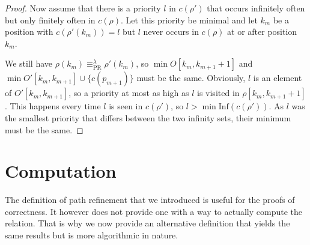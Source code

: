 \begin{proof}
	Now assume that there is a priority $l$ in $c(\rho')$ that occurs infinitely often but only finitely often in $c(\rho)$. Let this priority be minimal and let $k_m$ be a position with $c(\rho'(k_m)) = l$ but $l$ never occurs in $c(\rho)$ at or after position $k_m$.
	
	We still have $\rho(k_m) \equiv_\text{PR}^\lambda \rho'(k_m)$, so $\min O[k_m, k_{m+1} + 1]$ and $\min O'[k_m, k_{m+1}] \cup \{c(p_{m+1})\}$ must be the same. Obviously, $l$ is an element of $O'[k_m, k_{m+1}]$, so a priority at most as high as $l$ is visited in $\rho[k_m, k_{m+1} + 1]$. This happens every time $l$ is seen in $c(\rho')$, so $l > \min \text{Inf}(c(\rho'))$. As $l$ was the smallest priority that differs between the two infinity sets, their minimum must be the same.
\end{proof}



\section{Computation}
The definition of path refinement that we introduced is useful for the proofs of correctness. It however does not provide one with a way to actually compute the relation. That is why we now provide an alternative definition that yields the same results but is more algorithmic in nature.

